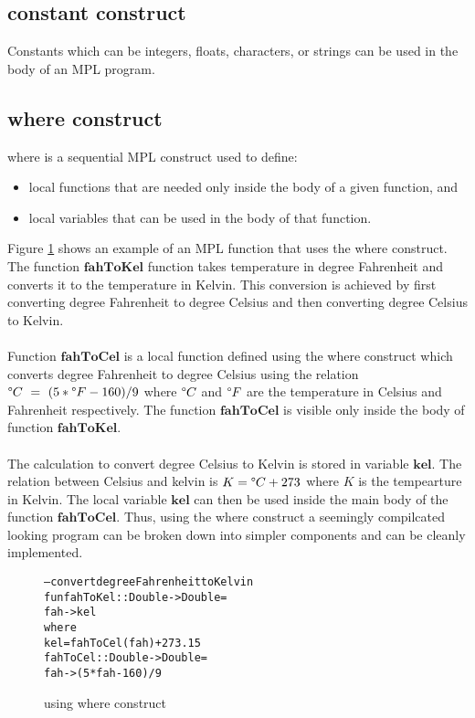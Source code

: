 \documentclass[11pt]{article}
\begin{document}
\subsection {constant construct}
Constants which can be integers, floats, characters, or strings can be used in the body of an MPL program.
\subsection {where construct}
{\sf where} is a sequential MPL construct used to define:
\begin{itemize}
\item local functions that are needed only inside the body of a given function, and
\item local variables that can be used in the body of that function.
\end{itemize}
Figure \ref {seqMPL:whereExam} shows an example of an MPL function that uses 
the {\sf where} construct. 
The function $\mathbf{fahToKel}$ function takes temperature in degree Fahrenheit and converts it to the temperature in Kelvin. This conversion is achieved by first converting degree Fahrenheit to degree Celsius and then converting degree Celsius to Kelvin.
~~\\~~\\ 
Function $\mathbf{fahToCel}$ is a local function defined using the {\sf where} construct which converts degree Fahrenheit to degree Celsius using the relation $\degree C~=~(5*\degree F - 160)/9$ where $\degree C$ and $\degree F$ are the temperature in Celsius and Fahrenheit respectively. The function $\mathbf{fahToCel}$ is visible only inside the body of function $\mathbf{fahToKel}$. 
~~\\~~\\ 
The calculation to convert degree Celsius to Kelvin is stored in variable $\mathbf{kel}$. The relation between Celsius and kelvin is $K = \degree C + 273$ where $K$ is the tempearture in Kelvin. The local variable $\mathbf{kel}$ can then be used inside the main body of the function $\mathbf{fahToCel}$. Thus, using the {\sf where} construct a seemingly compilcated looking program can be broken down into simpler components and can be cleanly implemented.
\begin{figure}[!h]
\begin{alltt}
                -- convert degree Fahrenheit to Kelvin
                fun fahToKel :: Double -> Double =
                  fah -> kel 
                      where
                        kel = fahToCel(fah) + 273.15
                        fahToCel :: Double -> Double =
                            fah -> (5*fah - 160)/9
\end{alltt} 
\caption{using where construct}
\label{seqMPL:whereExam}
\end{figure} 
\end{document}
